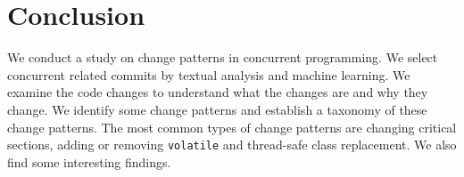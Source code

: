 \section{Conclusion}
We conduct a study on change patterns in concurrent programming. We select concurrent related commits by textual analysis and machine learning. We examine the code changes to understand what the changes are and why they change. We identify some change patterns and establish a taxonomy of these change patterns. The most common types of change patterns are changing critical sections, adding or removing \texttt{volatile} and thread-safe class replacement. We also find some interesting findings. 